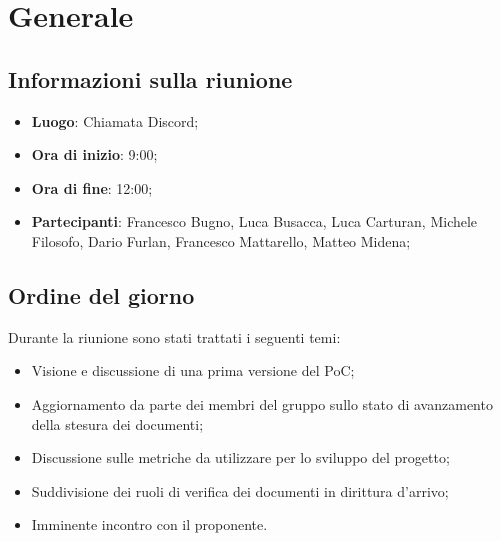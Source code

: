\section{Generale}

\vspace{10pt}


\subsection{Informazioni sulla riunione}
\begin{itemize}
	\item \textbf{Luogo}: Chiamata Discord\glo{};
	\item \textbf{Ora di inizio}: 9:00;
	\item \textbf{Ora di fine}: 12:00;
	\item \textbf{Partecipanti}: Francesco Bugno, Luca Busacca, Luca Carturan, Michele Filosofo,
	Dario Furlan, Francesco Mattarello, Matteo Midena;
\end{itemize}

\vspace{5pt}

\subsection{Ordine del giorno}
Durante la riunione sono stati trattati i seguenti temi:
\begin{itemize}
	\item Visione e discussione di una prima versione del PoC\glo;
	\item Aggiornamento da parte dei membri del gruppo sullo stato di avanzamento della stesura dei documenti;
	\item Discussione sulle metriche da utilizzare per lo sviluppo del progetto;
	\item Suddivisione dei ruoli di verifica dei documenti in dirittura d'arrivo;
	\item Imminente incontro con il proponente.
\end{itemize}

